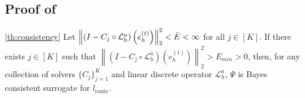 \documentclass{article} %
\begin{document}
\subsection{Proof of } \label{sec:proofconsistency}

\begin{customtheorem}{\ref{th:consistency}}
    Let $\left\|\left( I - C_{j} \circ \mathcal{L}_{h}^a\right)\left(e^{(t)}_h\right)\right\|^2_2 < \Bar{E} < \infty$  for all $j \in [K]$. If there exists $j\in [K]$ such that $\left\|\left( I - C_{j} \circ \mathcal{L}_{h}^a\right)\left(e^{(t)}_h\right)\right\|^2_2 > E_{min} > 0$, then, for any collection of solvers $\{C_j\}_{j= 1}^K$ and linear discrete operator $\mathcal{L}_h^a$, $\Psi$ is Bayes consistent surrogate for $l_{\text{route}}$.
\end{customtheorem}
\end{document}
